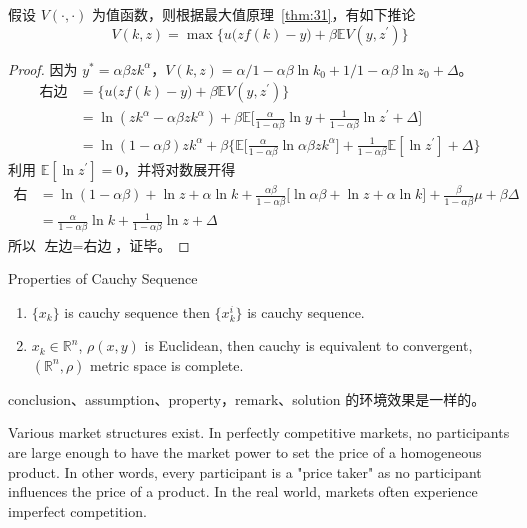 \documentclass[titlestyle=hang,11pt]{elegantbook}
\begin{document}
\begin{corollary}{}{}
假设 $V(\cdot,\cdot)$ 为值函数，则根据最大值原理~\ref{thm:31}，有如下推论
\[
V(k,z)=\max\Big\{u\big(zf(k)-y\big)+\beta \mathbb{E}V(y,z^\prime)\Big\}
\]
\end{corollary}

\begin{proof}
因为 $y^*=\alpha\beta z k^\alpha$，$V(k,z)=\alpha/1-\alpha\beta\ln k_0+1/1-\alpha\beta \ln z_0+\Delta$。
   \begin{align*}
   \text{右边}&=\Big\{u\big(zf(k)-y\big)+\beta \mathbb{E}V(y,z^\prime)\Big\}\\
   &=\ln(zk^\alpha-\alpha\beta zk^\alpha)+\beta\mathbb{E}\Big[\frac{\alpha}{1-\alpha\beta}\ln y+\frac{1}{1-\alpha\beta}\ln z^\prime+\Delta\Big]\\
   &=\ln(1-\alpha\beta)zk^\alpha+\beta\Big\{\mathbb{E}\big[\frac{\alpha}{1-\alpha\beta}\ln \alpha\beta z k^\alpha\big]+\frac{1}{1-\alpha\beta}\mathbb{E}[\ln z^\prime]+\Delta\Big\}
   \end{align*}
利用 $\mathbb{E}[\ln z^\prime]=0$，并将对数展开得
   \begin{align*}
   \text{右边}&=\ln (1-\alpha\beta)+\ln z+\alpha\ln k+\frac{\alpha\beta}{1-\alpha\beta}\big[\ln \alpha\beta+\ln z+\alpha\ln k\big]+\frac{\beta}{1-\alpha\beta}\mu+\beta \Delta\\
   &=\frac{\alpha}{1-\alpha\beta}\ln k+\frac{1}{1-\alpha\beta}\ln z+\Delta
   \end{align*}
所以 $\text{左边}=\text{右边}$，证毕。
\end{proof}



\begin{property}
Properties of Cauchy Sequence
\begin{enumerate}[noitemsep]
\item $\{x_k\}$ is cauchy sequence then $\{x_k^i\}$ is cauchy sequence.
\item $x_k\in \mathbb{R}^n$, $\rho(x,y)$ is Euclidean, then cauchy is equivalent to convergent, $(\mathbb{R}^n,\rho)$ metric space is complete.
\end{enumerate}
\end{property}

\begin{note}
conclusion、assumption、property，remark、solution 的环境效果是一样的。
\end{note}

Various market structures exist. In perfectly competitive markets, no participants are large enough to have the market power to set the price of a homogeneous product. In other words, every participant is a "price taker" as no participant influences the price of a product. In the real world, markets often experience imperfect competition.
\end{document}
